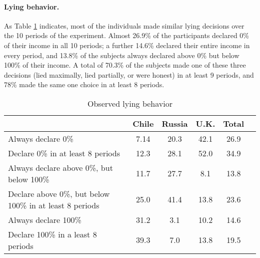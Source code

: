 \documentclass[12pt]{article}
\begin{document}

\paragraph{Lying behavior.} As Table \ref{repertoire} indicates, most of the individuals made similar lying decisions over the 10 periods of the experiment. Almost 26.9\% of the participants declared 0\% of their income in all 10 periods; a further 14.6\% declared their entire income in every period, and 13.8\% of the subjects always declared above 0\% but below 100\% of their income. A total of 70.3\% of the subjects made one of these three decisions (lied maximally, lied partially, or were honest) in at least 9 periods, and 78\% made the same one choice in at least 8 periods. 



\begin{table}[h!]
\begin{center}
\begin{tabular}{lccccc}
\hline\hline
  & Chile & Russia & U.K. &  Total  \\
  \hline\hline
Always declare 0\% & 7.14 & 20.3 & 42.1 & 26.9 \\
Declare 0\% in at least 8 periods & 12.3 & 28.1 & 52.0 & 34.9   \\
  \hline\hline
Always declare above 0\%, but below 100\% & 11.7 & 27.7 & 8.1 & 13.8   \\
Declare above 0\%, but below 100\% in at least 8 periods & 25.0 & 41.4 & 13.8 & 23.6 \\
  \hline\hline
Always declare 100\% & 31.2 & 3.1 & 10.2 & 14.6 \\
Declare 100\% in a least 8 periods & 39.3 & 7.0 & 13.8 & 19.5 \\
                  \hline\hline
\end{tabular}
\end{center}
\caption{Observed lying behavior}\label{repertoire}

\end{table}
\end{document}
